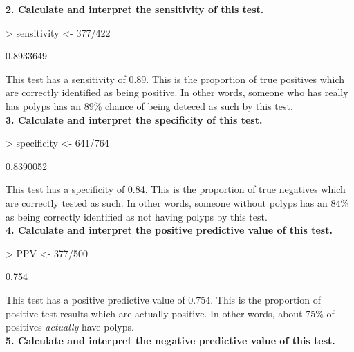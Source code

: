 \documentclass[12pt]{article}
\begin{document}
\noindent \textbf{2. Calculate and interpret the sensitivity of this test.}

\begin{Schunk}
\begin{Sinput}
> sensitivity <- 377/422
\end{Sinput}
\begin{Soutput}
[1] 0.8933649
\end{Soutput}
\end{Schunk}

\noindent This test has a sensitivity of 0.89.  This is the proportion of true positives which are correctly identified as being positive. In other words, someone who has really has polyps has an 89\% chance of being deteced as such by this test.  \\ 

\noindent \textbf{3. Calculate and interpret the specificity of this test.}

\begin{Schunk}
\begin{Sinput}
> specificity <- 641/764
\end{Sinput}
\begin{Soutput}
[1] 0.8390052
\end{Soutput}
\end{Schunk}

\noindent This test has a specificity of 0.84.  This is the proportion of true negatives which are correctly tested as such. In other words, someone without polyps has an 84\% as being correctly identified as not having polyps by this test.  \\

\noindent \textbf{4. Calculate and interpret the positive predictive value of this test.}

\begin{Schunk}
\begin{Sinput}
> PPV <- 377/500
\end{Sinput}
\begin{Soutput}
[1] 0.754
\end{Soutput}
\end{Schunk}

This test has a positive predictive value of 0.754.  This is the proportion of positive test results which are actually positive.  In other words, about 75\% of positives \emph{actually} have polyps. \\

\noindent \textbf{5. Calculate and interpret the negative predictive value of this test.}
\end{document}
